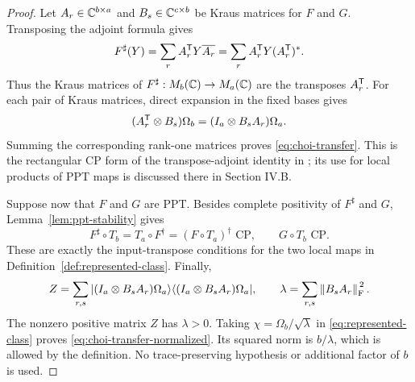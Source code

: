 \begin{proof}
Let $A_r\in\mathbb C^{b\times a}$ and $B_s\in\mathbb C^{c\times b}$ be Kraus matrices
for $F$ and $G$.  Transposing the adjoint formula gives
\[
 F^\sharp(Y)=\sum_r A_r^{\mathsf T}Y\overline{A_r}
            =\sum_r A_r^{\mathsf T}Y(A_r^{\mathsf T})^*.
\]
Thus the Kraus matrices of $F^\sharp:M_{b}(\mathbb C)\to M_{a}(\mathbb C)$ are the transposes
$A_r^{\mathsf T}$.  For each pair of Kraus matrices, direct expansion in the fixed
bases gives
\[
 (A_r^{\mathsf T}\otimes B_s)\Omega_b
       =(I_a\otimes B_sA_r)\Omega_a.
\]
Summing the corresponding rank-one matrices proves
\eqref{eq:choi-transfer}.  This is the rectangular CP form of the
transpose-adjoint identity in \cite[Lemma I.1(2)]{CMHW2019}; its use for
local products of PPT maps is discussed there in Section IV.B.

Suppose now that $F$ and $G$ are PPT.  Besides complete positivity of
$F^\sharp$ and $G$, Lemma~\ref{lem:ppt-stability} gives
\[
 F^\sharp\circ T_b=T_a\circ F^\dagger=(F\circ T_a)^\dagger
       \text{ CP},
 \qquad G\circ T_b\text{ CP}.
\]
These are exactly the input-transpose conditions for the two local maps in
Definition~\ref{def:represented-class}.  Finally,
\[
 Z=\sum_{r,s}|(I_a\otimes B_sA_r)\Omega_a\rangle
                 \langle(I_a\otimes B_sA_r)\Omega_a|,
 \qquad
 \lambda=\sum_{r,s}\left\lVert B_sA_r\right\rVert_{\mathrm F}^{\,2}.
\]
The nonzero positive matrix $Z$ has $\lambda>0$.  Taking
$\chi=\Omega_b/\sqrt\lambda$ in \eqref{eq:represented-class} proves
\eqref{eq:choi-transfer-normalized}.  Its squared norm is $b/\lambda$,
which is allowed by the definition.  No trace-preserving hypothesis or
additional factor of $b$ is used.
\end{proof}
